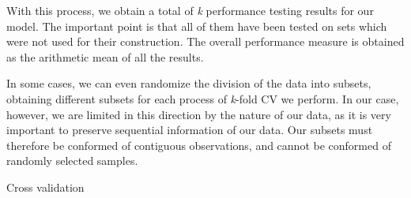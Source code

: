\documentclass[a4paper,12pt]{article}
\begin{document}
With this process, we obtain a total of \textit{k} performance testing results for our model. The important point is that all of them have been tested on sets which were not used for their construction. The overall performance measure is obtained as the arithmetic mean of all the results.

In some cases, we can even randomize the division of the data into subsets, obtaining different subsets for each process of \textit{k}-fold CV we perform. In our case, however, we are limited in this direction by the nature of our data, as it is very important to preserve sequential information of our data. Our subsets must therefore be conformed of contiguous observations, and cannot be conformed of randomly selected samples.

Cross validation\cite{han2006data}





\clearpage

 

\end{document}
